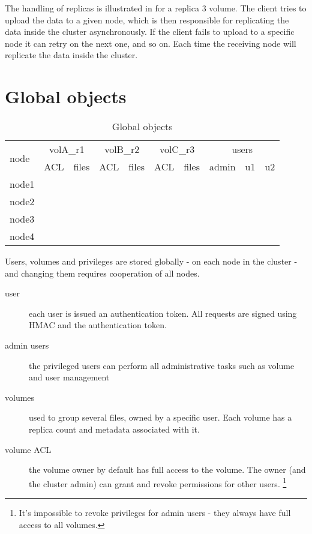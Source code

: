 The handling of replicas is illustrated in  for
a replica 3 volume. The client tries to upload the data to a given node,
which is then responsible for replicating the data inside the cluster
asynchronously. If the client fails to upload to a specific node it can
retry on the next one, and so on. Each time the receiving node will
replicate the data inside the cluster.

\section{Global objects}
\newcommand{\col}[1]{#1}
\begin{table}
	\centering
	\begin{tabular}{lccccccccc}
		\hline
		\multirow{2}{*}{node} & \multicolumn{2}{c}{volA\_r1} & \multicolumn{2}{c}{volB\_r2} & \multicolumn{2}{c}{volC\_r3} & \multicolumn{3}{c}{users} \\
		& \col{ACL} & \col{files} & \col{ACL} & \col{files} & \col{ACL} & \col{files} & admin & u1 & u2 \\
		\hline
		node1 & \cmark & \cmark & \cmark & \xmark & \cmark &  \xmark  & \cmark & \cmark & \cmark \\
		node2 & \cmark & \xmark & \cmark &  \cmark & \cmark & \cmark & \cmark & \cmark & \cmark \\
		node3 & \cmark & \xmark & \cmark & \cmark & \cmark & \cmark & \cmark & \cmark & \cmark \\
		node4 & \cmark & \xmark & \cmark & \xmark & \cmark &  \cmark & \cmark & \cmark & \cmark \\ 
		\hline
	\end{tabular}
	\caption{Global objects}
	\label{tab:globals}
\end{table}

Users, volumes and privileges are stored globally - on each node in the
cluster - and changing them requires cooperation of all nodes.

\begin{description}
\item[user] each user is issued an authentication token. All requests are
    signed using HMAC and the authentication token.
\item[admin users] the privileged users can perform all administrative tasks
    such as volume and user management
\item[volumes] used to group several files, owned by a specific user. Each
    volume has a replica count and metadata associated with it.
\item[volume ACL] the volume owner by default has full access to the volume.
    The owner (and the cluster admin) can grant and revoke permissions for
    other users. \footnote{It's impossible to revoke privileges for admin users
    - they always have full access to all volumes.}
\end{description}

